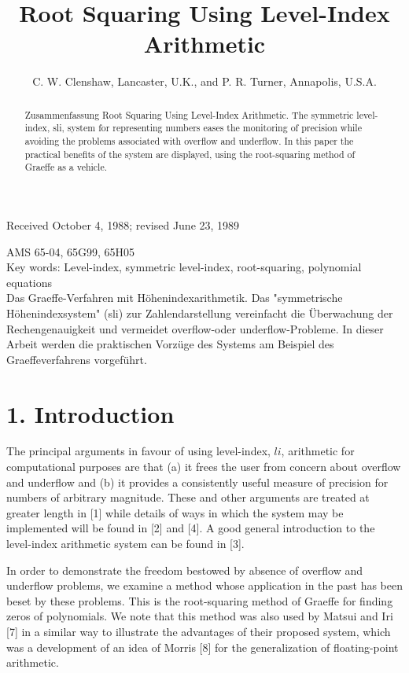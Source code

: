 \documentclass[10pt]{article}
\title{Root Squaring Using Level-Index Arithmetic }
\author{C. W. Clenshaw, Lancaster, U.K., and P. R. Turner, Annapolis, U.S.A.}
\date{}
\begin{document}
\maketitle
\captionsetup{singlelinecheck=false}
Received October 4, 1988; revised June 23, 1989

\begin{abstract}
Zusammenfassung Root Squaring Using Level-Index Arithmetic. The symmetric level-index, sli, system for representing numbers eases the monitoring of precision while avoiding the problems associated with overflow and underflow. In this paper the practical benefits of the system are displayed, using the root-squaring method of Graeffe as a vehicle.
\end{abstract}

AMS 65-04, 65G99, 65H05\\
Key words: Level-index, symmetric level-index, root-squaring, polynomial equations\\
Das Graeffe-Verfahren mit Höhenindexarithmetik. Das "symmetrische Höhenindexsystem" (sli) zur Zahlendarstellung vereinfacht die Überwachung der Rechengenauigkeit und vermeidet overflow-oder underflow-Probleme. In dieser Arbeit werden die praktischen Vorzüge des Systems am Beispiel des Graeffeverfahrens vorgeführt.

\section*{1. Introduction}
The principal arguments in favour of using level-index, $l i$, arithmetic for computational purposes are that (a) it frees the user from concern about overflow and underflow and (b) it provides a consistently useful measure of precision for numbers of arbitrary magnitude. These and other arguments are treated at greater length in [1] while details of ways in which the system may be implemented will be found in [2] and [4]. A good general introduction to the level-index arithmetic system can be found in [3].

In order to demonstrate the freedom bestowed by absence of overflow and underflow problems, we examine a method whose application in the past has been beset by these problems. This is the root-squaring method of Graeffe for finding zeros of polynomials. We note that this method was also used by Matsui and Iri [7] in a similar way to illustrate the advantages of their proposed system, which was a development of an idea of Morris [8] for the generalization of floating-point arithmetic.
\end{document}
